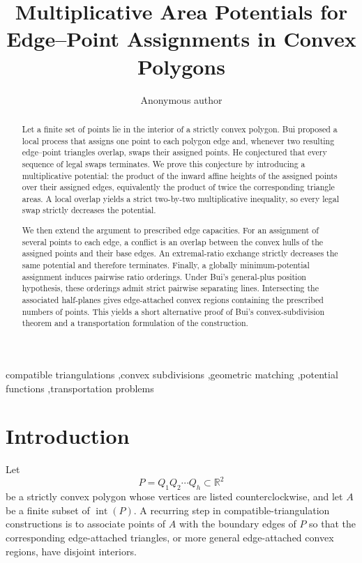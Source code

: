 \documentclass[final,5p,times,twocolumn]{elsarticle}
\theoremstyle{definition}
\theoremstyle{remark}
\newcommand{\interior}[1]{\operatorname{int}(#1)}
\newcommand{\R}{\mathbb{R}}
\begin{document}
\begin{frontmatter}

\title{Multiplicative Area Potentials for Edge--Point Assignments in Convex Polygons}

\author{Anonymous author}

\begin{abstract}
Let a finite set of points lie in the interior of a strictly convex polygon. Bui proposed a local process that assigns one point to each polygon edge and, whenever two resulting edge--point triangles overlap, swaps their assigned points. He conjectured that every sequence of legal swaps terminates. We prove this conjecture by introducing a multiplicative potential: the product of the inward affine heights of the assigned points over their assigned edges, equivalently the product of twice the corresponding triangle areas. A local overlap yields a strict two-by-two multiplicative inequality, so every legal swap strictly decreases the potential.

We then extend the argument to prescribed edge capacities. For an assignment of several points to each edge, a conflict is an overlap between the convex hulls of the assigned points and their base edges. An extremal-ratio exchange strictly decreases the same potential and therefore terminates. Finally, a globally minimum-potential assignment induces pairwise ratio orderings. Under Bui's general-plus position hypothesis, these orderings admit strict pairwise separating lines. Intersecting the associated half-planes gives edge-attached convex regions containing the prescribed numbers of points. This yields a short alternative proof of Bui's convex-subdivision theorem and a transportation formulation of the construction.
\end{abstract}

\begin{keyword}
compatible triangulations \sep convex subdivisions \sep geometric matching \sep potential functions \sep transportation problems
\end{keyword}

\end{frontmatter}

\section{Introduction}
\label{sec:intro}

Let
\[
P=Q_1Q_2\cdots Q_h\subset\R^2
\]
be a strictly convex polygon whose vertices are listed counterclockwise, and let $A$ be a finite subset of $\interior P$. A recurring step in compatible-triangulation constructions is to associate points of $A$ with the boundary edges of $P$ so that the corresponding edge-attached triangles, or more general edge-attached convex regions, have disjoint interiors.
\end{document}

